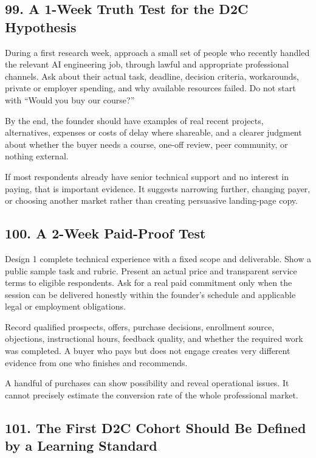 \subsection*{99. A 1-Week Truth Test for the D2C Hypothesis}

During a first research week, approach a small set of people who recently handled the relevant AI engineering job, through lawful and appropriate professional channels. Ask about their actual task, deadline, decision criteria, workarounds, private or employer spending, and why available resources failed. Do not start with ``Would you buy our course?''

By the end, the founder should have examples of real recent projects, alternatives, expenses or costs of delay where shareable, and a clearer judgment about whether the buyer needs a course, one-off review, peer community, or nothing external.

If most respondents already have senior technical support and no interest in paying, that is important evidence. It suggests narrowing further, changing payer, or choosing another market rather than creating persuasive landing-page copy.

\subsection*{100. A 2-Week Paid-Proof Test}

Design 1 complete technical experience with a fixed scope and deliverable. Show a public sample task and rubric. Present an actual price and transparent service terms to eligible respondents. Ask for a real paid commitment only when the session can be delivered honestly within the founder's schedule and applicable legal or employment obligations.

Record qualified prospects, offers, purchase decisions, enrollment source, objections, instructional hours, feedback quality, and whether the required work was completed. A buyer who pays but does not engage creates very different evidence from one who finishes and recommends.

A handful of purchases can show possibility and reveal operational issues. It cannot precisely estimate the conversion rate of the whole professional market.

\subsection*{101. The First D2C Cohort Should Be Defined by a Learning Standard}

